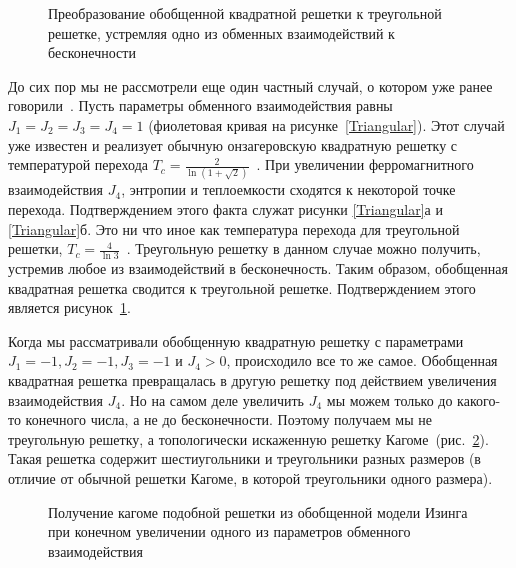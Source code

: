 \documentclass[utf8,12pt]{jetp}
\begin{document}
\begin{figure}[h]
	\caption{Преобразование обобщенной квадратной решетки к треугольной решетке, устремляя одно из обменных взаимодействий к бесконечности}
	\label{triag}
\end{figure}

До сих пор мы не рассмотрели еще один частный случай, о котором уже ранее говорили~\cite{generalizedIsing2021}. Пусть параметры обменного взаимодействия равны $J_1 = J_2 = J_3 = J_4 = 1$ (фиолетовая кривая на рисунке~\ref{Triangular}). Этот случай уже известен и реализует обычную онзагеровскую квадратную решетку с температурой перехода $T_c = \frac{2}{\ln (1+\sqrt{2})}$~\cite{kramers_wannier1, kramers_wannier2}. При увеличении ферромагнитного взаимодействия $J_4$, энтропии и теплоемкости сходятся к некоторой точке перехода. Подтверждением этого факта служат рисунки \ref{Triangular}а и \ref{Triangular}б. Это ни что иное как температура перехода для треугольной решетки, $T_c = \frac{4}{\ln 3}$~\cite{wannier1950}. Треугольную решетку в данном случае можно получить, устремив любое из взаимодействий в бесконечность. Таким образом, обобщенная квадратная решетка сводится к треугольной решетке. Подтверждением этого является рисунок~\ref{triag}. 

Когда мы рассматривали обобщенную квадратную решетку с параметрами $J_1 = -1, J_2 =-1, J_3 = -1$ и $J_4 > 0$, происходило все то же самое. Обобщенная квадратная решетка превращалась в другую решетку под действием увеличения взаимодействия $J_4$. Но на самом деле увеличить $J_4$ мы можем только до какого-то конечного числа, а не до бесконечности. Поэтому получаем мы не треугольную решетку, а топологически искаженную решетку Кагоме~(рис.~\ref{kagomelike}). Такая решетка содержит шестиугольники и треугольники разных размеров (в отличие от обычной решетки Кагоме, в которой треугольники одного размера). 

\begin{figure}[h]
	\caption{Получение кагоме подобной решетки из обобщенной модели Изинга при конечном увеличении одного из параметров обменного взаимодействия}
	\label{kagomelike}
\end{figure}
\end{document}
